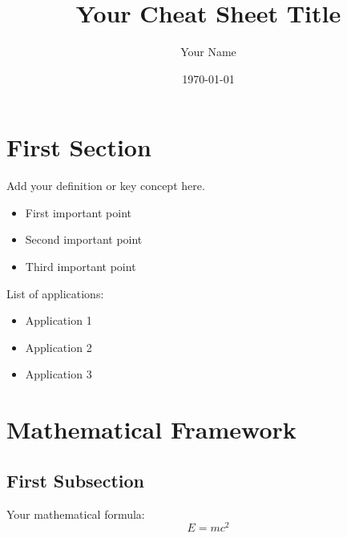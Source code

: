 \documentclass[darkmode]{a3cheatsheet}
\title{Your Cheat Sheet Title}
\author{Your Name}
\date{\today}
\begin{document}

\begin{multicols}{3}

\section{First Section}

\begin{infobox}
Add your definition or key concept here.
\end{infobox}


\begin{itemize}
    \item First important point
    \item Second important point
    \item Third important point
\end{itemize}

\begin{notebox}[Applications]
List of applications:
\begin{itemize}
    \item Application 1
    \item Application 2
    \item Application 3
\end{itemize}
\end{notebox}

\section{Mathematical Framework}

\subsection{First Subsection}

\begin{formulabox}
Your mathematical formula:
\begin{equation}
E = mc^2
\end{equation}
\end{formulabox}


\end{multicols}
\end{document}
